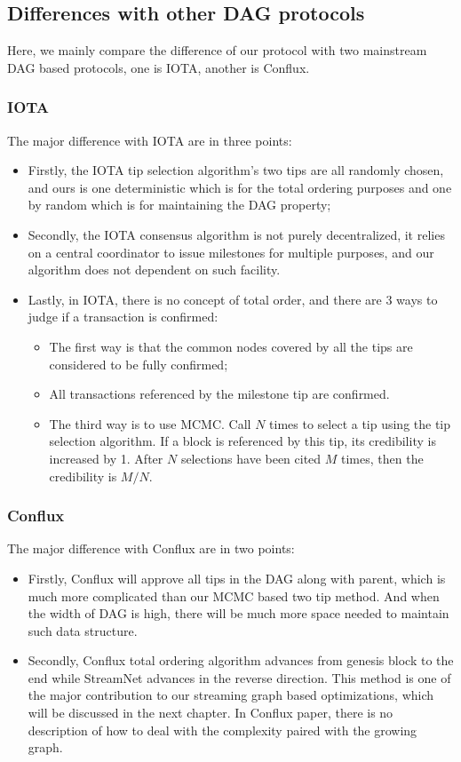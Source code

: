 \subsection{Differences with other DAG protocols}
Here, we mainly compare the difference of our protocol with two mainstream DAG based protocols, one is IOTA, another is Conflux.

\subsubsection{IOTA}
The major difference with IOTA are in three points:
\begin{itemize}
    \item Firstly, the IOTA tip selection algorithm's two tips are all randomly chosen, 
        and ours is one deterministic which is for the total ordering purposes and one by random which is for maintaining the DAG property; 
    \item Secondly, the IOTA consensus algorithm is not purely decentralized, 
        it relies on a central coordinator to issue milestones for multiple purposes, and our algorithm does not dependent on such facility. 
    \item Lastly, in IOTA, there is no concept of total order,
        and there are 3 ways to judge if a transaction is confirmed: 
    \begin{itemize}
        \item The first way is that the common nodes covered by all the tips are considered to be fully confirmed; 
        \item All transactions referenced by the milestone tip are confirmed.
        \item The third way is to use MCMC.
            Call $N$ times to select a tip using the tip selection algorithm.
            If a block is referenced by this tip, its credibility is increased by 1.
            After $N$ selections have been cited $M$ times, then the credibility is $M / N$.
    \end{itemize}
\end{itemize}

\subsubsection{Conflux}
The major difference with Conflux are in two points:
\begin{itemize}
    \item Firstly, Conflux will approve all tips in the DAG along with parent, which is much more complicated than our MCMC based two tip method. 
        And when the width of DAG is high, there will be much more space needed to maintain such data structure. 
    \item Secondly, Conflux total ordering algorithm advances from genesis block to the end while StreamNet advances in the reverse direction. 
        This method is one of the major contribution to our streaming graph based optimizations,
        which will be discussed in the next chapter. 
        In Conflux paper, there is no description of how to deal with the complexity paired with the growing graph.
\end{itemize}

